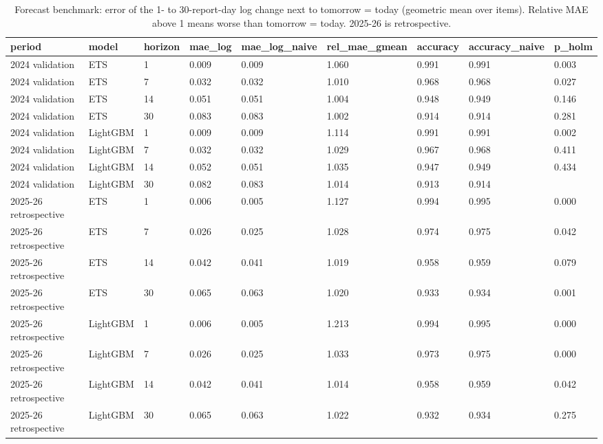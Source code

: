 \begin{table}
\caption{Forecast benchmark: error of the 1- to 30-report-day log change next to tomorrow = today (geometric mean over items). Relative MAE above 1 means worse than tomorrow = today. 2025-26 is retrospective.}
\label{tab:r4}
\begin{tabular}{lllllllll}
\toprule
period & model & horizon & mae\_log & mae\_log\_naive & rel\_mae\_gmean & accuracy & accuracy\_naive & p\_holm \\
\midrule
2024 validation & ETS & 1 & 0.009 & 0.009 & 1.060 & 0.991 & 0.991 & 0.003 \\
2024 validation & ETS & 7 & 0.032 & 0.032 & 1.010 & 0.968 & 0.968 & 0.027 \\
2024 validation & ETS & 14 & 0.051 & 0.051 & 1.004 & 0.948 & 0.949 & 0.146 \\
2024 validation & ETS & 30 & 0.083 & 0.083 & 1.002 & 0.914 & 0.914 & 0.281 \\
2024 validation & LightGBM & 1 & 0.009 & 0.009 & 1.114 & 0.991 & 0.991 & 0.002 \\
2024 validation & LightGBM & 7 & 0.032 & 0.032 & 1.029 & 0.967 & 0.968 & 0.411 \\
2024 validation & LightGBM & 14 & 0.052 & 0.051 & 1.035 & 0.947 & 0.949 & 0.434 \\
2024 validation & LightGBM & 30 & 0.082 & 0.083 & 1.014 & 0.913 & 0.914 &  \\
2025-26 retrospective & ETS & 1 & 0.006 & 0.005 & 1.127 & 0.994 & 0.995 & 0.000 \\
2025-26 retrospective & ETS & 7 & 0.026 & 0.025 & 1.028 & 0.974 & 0.975 & 0.042 \\
2025-26 retrospective & ETS & 14 & 0.042 & 0.041 & 1.019 & 0.958 & 0.959 & 0.079 \\
2025-26 retrospective & ETS & 30 & 0.065 & 0.063 & 1.020 & 0.933 & 0.934 & 0.001 \\
2025-26 retrospective & LightGBM & 1 & 0.006 & 0.005 & 1.213 & 0.994 & 0.995 & 0.000 \\
2025-26 retrospective & LightGBM & 7 & 0.026 & 0.025 & 1.033 & 0.973 & 0.975 & 0.000 \\
2025-26 retrospective & LightGBM & 14 & 0.042 & 0.041 & 1.014 & 0.958 & 0.959 & 0.042 \\
2025-26 retrospective & LightGBM & 30 & 0.065 & 0.063 & 1.022 & 0.932 & 0.934 & 0.275 \\
\bottomrule
\end{tabular}
\end{table}
